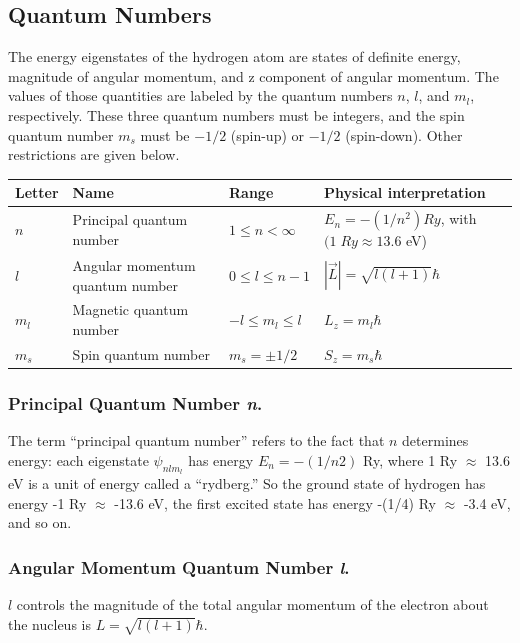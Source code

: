 \documentclass[../main.tex]{subfiles}
\begin{document}
\subsection*{Quantum Numbers}
The energy eigenstates of the hydrogen atom are states of definite energy, magnitude of angular momentum, and z component of angular momentum. The values of those quantities are labeled by the quantum numbers $n$, $l$, and $m_l$, respectively. These three quantum numbers must be integers, and the spin quantum number $m_s$ must be $-1/2$ (spin-up) or $-1/2$ (spin-down). Other restrictions are given below.
\begin{center}
    \begin{tabular}{| p{} | p{} | p{} | p{}|}
        \hline
        Letter&Name&Range&Physical interpretation\\
        \hline
        $n$&Principal quantum number&$1 \leq n <\infty$&$E_n = -(1/n^2) Ry$, with $ (1 \;Ry \approx 13.6$ eV)\\
        $l$&Angular momentum quantum number&$0 \leq l \leq n - 1$ &$ |\overrightarrow{L}| = \sqrt{l(l + 1) }\hbar$\\
        $m_l$&Magnetic quantum number&$-l \leq m_l \leq l$&$L_z = m_l\hbar$\\
        $m_s$&Spin quantum number&$m_s = \pm 1/2$&$S_z = m_s\hbar$\\\hline
    \end{tabular}
\end{center}

\subsubsection*{Principal Quantum Number \emph{n}.} The term “principal quantum number” refers to the fact that $n$ determines energy: each eigenstate $\psi_{nlm_l}$  has energy $E_n = -(1/n2)$ Ry, where 1 Ry $\approx$ 13.6 eV is a unit of energy called a “rydberg.” So the ground state of hydrogen has energy -1 Ry $\approx$ -13.6 eV, the first excited state has energy -(1/4) Ry $\approx$ -3.4 eV, and so on.

\subsubsection*{Angular Momentum Quantum Number \emph{l}.} $l$ controls the magnitude of the total angular momentum of the electron about the nucleus is $L = \sqrt{l(l + 1)} \hbar$.
\end{document}
